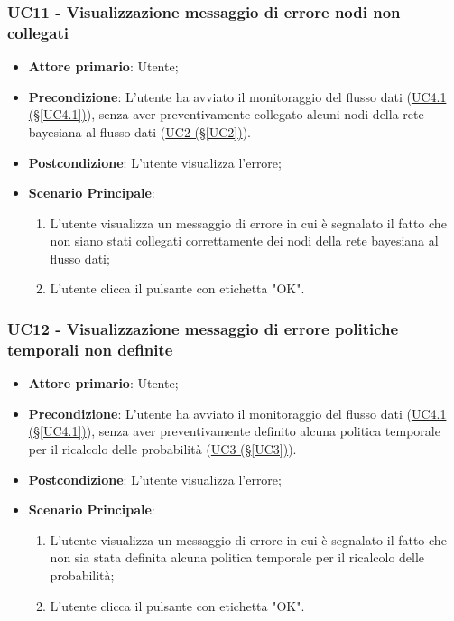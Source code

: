 \pagebreak

\subsubsection{UC11 - Visualizzazione messaggio di errore nodi non collegati}\label{UC11}
\begin{itemize}
\item \textbf{Attore primario}: Utente;
\item \textbf{Precondizione}: L'utente ha avviato il monitoraggio del flusso dati (\hyperref[UC4.1]{UC4.1 							(§\ref*{UC4.1})}), senza aver preventivamente collegato alcuni nodi della rete bayesiana al flusso dati 							(\hyperref[UC2]{UC2 (§\ref*{UC2})}).
\item \textbf{Postcondizione}: L'utente visualizza l'errore;
\item \textbf{Scenario Principale}: 
	\begin{enumerate}
	\item L'utente visualizza un messaggio di errore in cui è segnalato il fatto che non siano stati collegati 						correttamente dei nodi della rete bayesiana al flusso dati;
	\item L'utente clicca il pulsante con etichetta "OK".
	\end{enumerate}
\end{itemize}

\pagebreak

\subsubsection{UC12 - Visualizzazione messaggio di errore politiche temporali non definite}\label{UC12}
\begin{itemize}
\item \textbf{Attore primario}: Utente;
\item \textbf{Precondizione}: L'utente ha avviato il monitoraggio del flusso dati (\hyperref[UC4.1]{UC4.1 							(§\ref*{UC4.1})}), senza aver preventivamente definito alcuna politica temporale per il ricalcolo delle 							probabilità (\hyperref[UC3]{UC3 (§\ref*{UC3})}).
\item \textbf{Postcondizione}: L'utente visualizza l'errore;
\item \textbf{Scenario Principale}: 
	\begin{enumerate}
	\item L'utente visualizza un messaggio di errore in cui è segnalato il fatto che non sia stata definita alcuna 				politica temporale per il ricalcolo delle probabilità;
	\item L'utente clicca il pulsante con etichetta "OK".
	\end{enumerate}
\end{itemize}

